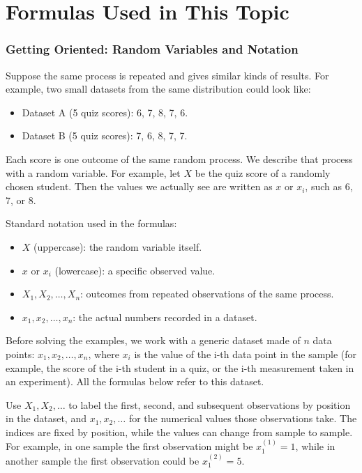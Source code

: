 \chapter{Formulas Used in This Topic}\label{sec:interval-formulas}

\subsection{Getting Oriented: Random Variables and Notation}\label{sec:interval-notation}

Suppose the same process is repeated and gives similar kinds of results. For example, two small datasets from the same distribution could look like:

\begin{itemize}
	\item Dataset A (5 quiz scores): 6, 7, 8, 7, 6.
	\item Dataset B (5 quiz scores): 7, 6, 8, 7, 7.
\end{itemize}

Each score is one outcome of the same random process. We describe that process with a random variable. For example, let \(X\) be the quiz score of a randomly chosen student. Then the values we actually see are written as \(x\) or \(x_i\), such as 6, 7, or 8.

Standard notation used in the formulas:

\begin{itemize}
	\item \(X\) (uppercase): the random variable itself.
	\item \(x\) or \(x_i\) (lowercase): a specific observed value.
	\item \(X_1, X_2, \dots, X_n\): outcomes from repeated observations of the same process.
	\item \(x_1, x_2, \dots, x_n\): the actual numbers recorded in a dataset.
\end{itemize}

Before solving the examples, we work with a generic dataset made of \(n\) data points: \(x_1, x_2, \dots, x_n\), where \(x_i\) is the value of the i-th data point in the sample (for example, the score of the i-th student in a quiz, or the i-th measurement taken in an experiment). All the formulas below refer to this dataset.

Use \(X_1, X_2, \dots\) to label the first, second, and subsequent observations by position in the dataset, and \(x_1, x_2, \dots\) for the numerical values those observations take. The indices are fixed by position, while the values can change from sample to sample. For example, in one sample the first observation might be \(x_1^{(1)} = 1\), while in another sample the first observation could be \(x_1^{(2)} = 5\).

